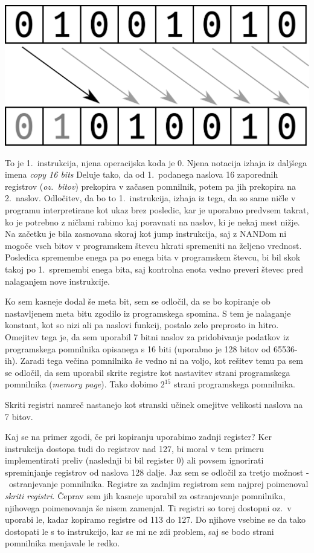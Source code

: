 \documentclass[12pt]{article}
\begin{document}
\begin{center}
  \includegraphics[width=.3\linewidth]{slike/predstavitev/copy.png}
\end{center}

To je 1.\ instrukcija, njena operacijska koda je $0$.
Njena notacija izhaja iz daljšega imena \textit{copy 16 bits}
Deluje tako, da od 1.\ podanega naslova 16 zaporednih registrov (\textit{oz.\ bitov}) prekopira v začasen pomnilnik, potem pa jih prekopira na 2.\ naslov.
Odločitev, da bo to 1.\ instrukcija, izhaja iz tega, da so same ničle v programu interpretirane kot ukaz brez posledic, kar je uporabno predvsem takrat, ko je potrebno z ničlami rabimo kaj poravnati na naslov, ki je nekaj mest nižje.
Na začetku je bila zasnovana skoraj kot jump instrukcija, saj z NANDom ni mogoče vseh bitov v programskem števcu hkrati spremeniti na željeno vrednost.
Posledica spremembe enega pa po enega bita v programskem števcu, bi bil skok takoj po 1.\ spremembi enega bita, saj kontrolna enota vedno preveri števec pred nalaganjem nove instrukcije.

Ko sem kasneje dodal še meta bit, sem se odločil, da se bo kopiranje ob nastavljenem meta bitu zgodilo iz programskega spomina.
S tem je nalaganje konstant, kot so nizi ali pa naslovi funkcij, postalo zelo preprosto in hitro.
Omejitev tega je, da sem uporabil 7 bitni naslov za pridobivanje podatkov iz programskega pomnilnika opisanega s 16 biti (uporabno je 128 bitov od 65536-ih).
Zaradi tega večina pomnilnika še vedno ni na voljo, kot rešitev temu pa sem se odločil, da sem uporabil skrite registre kot nastavitev strani programskega pomnilnika (\textit{memory page}).
Tako dobimo $2^{15}$ strani programskega pomnilnika.

Skriti registri namreč nastanejo kot stranski učinek omejitve velikosti naslova na 7 bitov.

Kaj se na primer zgodi, če pri kopiranju uporabimo zadnji register?
Ker instrukcija dostopa tudi do registrov nad 127, bi moral v tem primeru implementirati preliv (naslednji bi bil register 0) ali povsem ignorirati spreminjanje registrov od naslova 128 dalje.
Jaz sem se odločil za tretjo možnost -\ ostranjevanje pomnilnika.
Registre za zadnjim registrom sem najprej poimenoval \textit{skriti registri}.
Čeprav sem jih kasneje uporabil za ostranjevanje pomnilnika, njihovega poimenovanja še nisem zamenjal.
Ti registri so torej dostopni oz.\ v uporabi le, kadar kopiramo registre od 113 do 127.
Do njihove vsebine se da tako dostopati le s to instrukcijo, kar se mi ne zdi problem, saj se bodo strani pomnilnika menjavale le redko.
\end{document}
